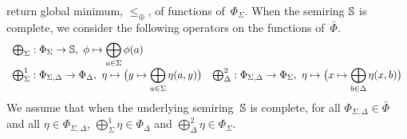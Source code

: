 return global minimum, \wrt $\leq_\oplus$, of functions of~$\Phi_\Sigma$.
%
When the semiring $\mathbb{S}$ is complete, we
consider the following operators on the functions of~$\bar\Phi$. %
\[
\begin{array}{ll}
\bigoplus_\Sigma : \Phi_\Sigma \to \mathbb{S},\
  \phi \mapsto \displaystyle\bigoplus_{a \in \Sigma} \phi(a)\\
\bigoplus^1_\Sigma :
  \Phi_{\Sigma,\Delta} \to \Phi_\Delta,\
  \eta \mapsto \bigl( y \mapsto \displaystyle\bigoplus_{a \in \Sigma} \eta(a, y) \bigr) &
\bigoplus^2_\Delta :
  \Phi_{\Sigma,\Delta} \to \Phi_\Sigma,\
  \eta \mapsto \bigl( x \mapsto \displaystyle\bigoplus_{b \in \Delta} \eta(x, b) \bigr)\\
\end{array}
\]
%
%
We assume that when the underlying semiring~$\mathbb{S}$ is complete,
for all $\Phi_{\Sigma, \Delta} \in \bar\Phi$
and all $\eta \in \Phi_{\Sigma, \Delta}$,
$\bigoplus^1_\Sigma \eta \in \Phi_{\Delta}$ and
$\bigoplus^2_\Delta \eta \in \Phi_{\Sigma}$.

